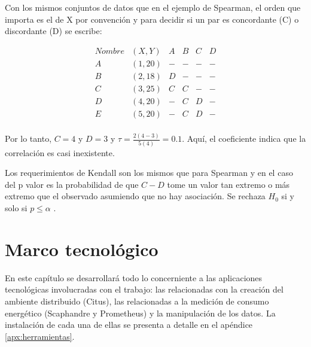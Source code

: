 \documentclass[12pt, letter paper]{report}
\begin{document}
        Con los mismos conjuntos de datos que en el ejemplo de Spearman, el
        orden que importa es el de X por convención y para decidir si un par
        es concordante (C) o discordante (D) se escribe:

        $$\begin{matrix}
          Nombre & (X, Y)  & A & B & C & D \\
             A   & (1, 20) & - & - & - & - \\
             B   & (2, 18) & D & - & - & - \\
             C   & (3, 25) & C & C & - & - \\
             D   & (4, 20) & - & C & D & - \\
             E   & (5, 20) & - & C & D & - \\
        \end{matrix}$$

        Por lo tanto, $C = 4$ y $D = 3$ y $\tau = \frac{2(4 - 3)}{5(4)} =
        \num{0,1}$. Aquí, el coeficiente indica que la correlación es casi
        inexistente.

        Los requerimientos de Kendall son los mismos que para Spearman y en el
        caso del p valor es la probabilidad de que $C - D$ tome un valor tan
        extremo o más extremo que el observado asumiendo que no hay asociación.
        Se rechaza $H_0$ si y solo si $p \le \alpha$ \cite{kendall1948rank}.

  \chapter{Marco tecnológico}
  \label{cha:marco_tecnológico}
    En este capítulo se desarrollará todo lo concerniente a las aplicaciones
    tecnológicas involucradas con el trabajo: las relacionadas con la creación
    del ambiente distribuido (Citus), las relacionadas a la medición de consumo
    energético (Scaphandre y Prometheus) y la manipulación de los datos. La
    instalación de cada una de ellas se presenta a detalle en el apéndice
    \ref{apx:herramientas}.
\end{document}

